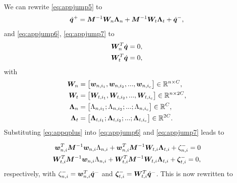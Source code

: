 \documentclass[../DC2017114Bouma.tex]{subfiles}
\begin{document}
We can rewrite \eqref{eq:appjump5} to
\begin{align}
\dot{{\boldsymbol{q}}}^+ = {\boldsymbol{M}}^{-1}{\boldsymbol{W}}_{n}\boldsymbol{\Lambda}_{n} + {\boldsymbol{M}}^{-1}{\boldsymbol{W}}_{t}\boldsymbol{\Lambda}_{t} + \dot{{\boldsymbol{q}}}^-,\label{eq:appqplus}
\end{align}
and \eqref{eq:appjump6}, \eqref{eq:appjump7} to
\begin{align}
{\boldsymbol{W}}_{n}^T\dot{{\boldsymbol{q}}} = 0,\\
{\boldsymbol{W}}_{t}^T\dot{{\boldsymbol{q}}} = 0,
\end{align}
with
\begin{align}
{\boldsymbol{W}}_n &= \begin{bmatrix}
{\boldsymbol{w}}_{n,i_1},{\boldsymbol{w}}_{n,i_2},...,{\boldsymbol{w}}_{n,i_c}
\end{bmatrix}\in\mathbb{R}^{n\times C},\\
{\boldsymbol{W}}_t &= \begin{bmatrix}
{\boldsymbol{W}}_{t,i_1},{\boldsymbol{W}}_{t,i_2},...,{\boldsymbol{W}}_{t,i_c} 
\end{bmatrix}\in\mathbb{R}^{n\times 2C},\\
\boldsymbol{\Lambda}_n &= \begin{bmatrix}
\Lambda_{n,i_1};\Lambda_{n,i_2};...;\Lambda_{n,i_c} 
\end{bmatrix}\in\mathbb{R}^{C},\\
\boldsymbol{\Lambda}_t &= \begin{bmatrix}
\boldsymbol{\Lambda}_{t,i_1};\boldsymbol{\Lambda}_{t,i_2};...;\boldsymbol{\Lambda}_{t,i_c} 
\end{bmatrix}\in\mathbb{R}^{2C}.
\end{align}
Substituting \eqref{eq:appqplus} into \eqref{eq:appjump6} and \eqref{eq:appjump7} leads to

\begin{align}
{\boldsymbol{w}}_{n,i}^T{\boldsymbol{M}}^{-1}{\boldsymbol{w}}_{n,i}\Lambda_{n,i} + {\boldsymbol{w}}_{n,i}^T{\boldsymbol{M}}^{-1}{\boldsymbol{W}}_{t,i}\boldsymbol{\Lambda}_{t,i} + \zeta_{n,i}^- = 0\\
{\boldsymbol{W}}_{t,i}^T{\boldsymbol{M}}^{-1}{\boldsymbol{w}}_{n,i}\Lambda_{n,i} + {\boldsymbol{W}}_{t,i}^T{\boldsymbol{M}}^{-1}{\boldsymbol{W}}_{t,i}\boldsymbol{\Lambda}_{t,i} + \boldsymbol{\zeta}_{t,i}^- = 0,
\end{align}
respectively, with $\zeta_{n,i}^- = {\boldsymbol{w}}_{n,i}^T\dot{{\boldsymbol{q}}}^-$ and $\boldsymbol{\zeta}_{t,i}^- = {\boldsymbol{W}}_{t,i}^T\dot{{\boldsymbol{q}}}^-$. This is now rewritten to
\end{document}
